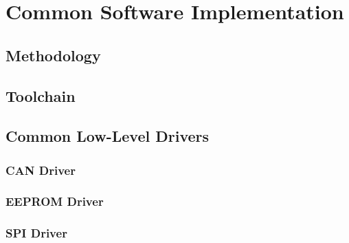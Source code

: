\section{Common Software Implementation\label{sec:Software-Implementation}}


\subsection{Methodology}


\subsection{Toolchain}


\subsection{Common Low-Level Drivers}


\subsubsection{CAN Driver}


\subsubsection{EEPROM Driver}


\subsubsection{SPI Driver}